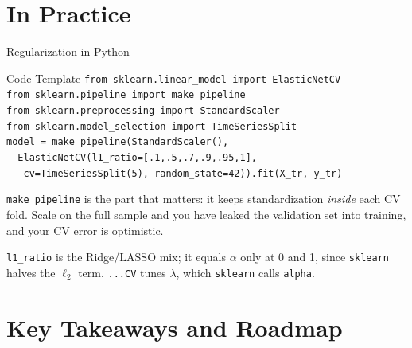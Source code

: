 \documentclass[aspectratio=169, 11pt]{beamer}
\begin{document}
\section{In Practice}


\begin{frame}{Regularization in Python}
  \begin{examplebox}{Code Template}
    {\scriptsize
    \texttt{from sklearn.linear\_model import ElasticNetCV}\\
    \texttt{from sklearn.pipeline import make\_pipeline}\\
    \texttt{from sklearn.preprocessing import StandardScaler}\\
    \texttt{from sklearn.model\_selection import TimeSeriesSplit}\\[2pt]
    \texttt{model = make\_pipeline(StandardScaler(),}\\
    \texttt{\mbox{}\ \ ElasticNetCV(l1\_ratio=[.1,.5,.7,.9,.95,1],}\\
    \texttt{\mbox{}\ \ \ cv=TimeSeriesSplit(5), random\_state=42)).fit(X\_tr, y\_tr)}
    }
  \end{examplebox}
  \texttt{make\_pipeline} is the part that matters: it keeps standardization \emph{inside}
  each CV fold. Scale on the full sample and you have leaked the validation set into
  training, and your CV error is optimistic.

  \texttt{l1\_ratio} is the Ridge/LASSO mix; it equals $\alpha$ only at 0 and 1, since \texttt{sklearn}
  halves the $\ell_2$ term. \texttt{...CV} tunes $\lambda$, which \texttt{sklearn} calls \texttt{alpha}.
\end{frame}

\section{Key Takeaways and Roadmap}

\end{document}
